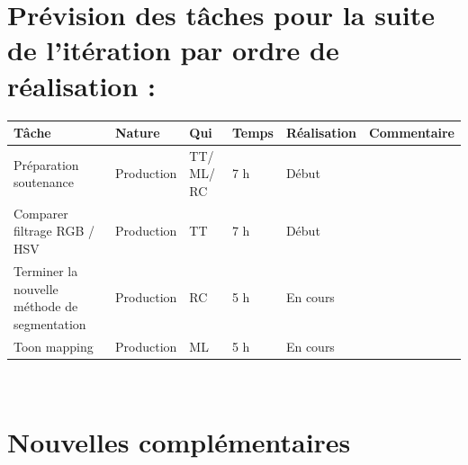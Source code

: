 \documentclass[12pt,titlepage,french]{article}
\begin{document}
\section{Prévision des tâches pour la suite de l'itération par ordre de réalisation :}

\noindent\begin{tabularx}{17cm}{|p{2.5cm}|p{2.5cm}|p{1cm}|p{1.5cm}|p{2.5cm}|X|}
    \hline
    \textbf{Tâche} & \textbf{Nature} & \textbf{Qui} & \textbf{Temps} & \textbf{Réalisation} & \textbf{Commentaire} \\
    \hline
    Préparation soutenance & Production & TT/ ML/ RC & 7 h & Début & \\
    \hline
    Comparer filtrage RGB / HSV & Production & TT & 7 h & Début & \\
    \hline
    Terminer la nouvelle méthode de segmentation & Production & RC & 5 h & En cours & \\
    \hline
    Toon mapping & Production & ML & 5 h & En cours & \\
    \hline
\end{tabularx} \\

\section{Nouvelles complémentaires}
\end{document}
